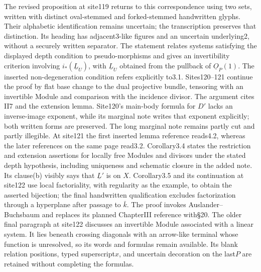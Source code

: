 The revised proposition at site119 returns to this correspondence using two sets, written with distinct oval-stemmed and forked-stemmed handwritten glyphs. Their alphabetic identification remains uncertain; the transcription preserves that distinction. Its heading has adjacent3-like figures and an uncertain underlying2, without a securely written separator. The statement relates systems satisfying the displayed depth condition to pseudo-morphisms and gives an invertibility criterion involving $i_*(\underline L_U)$, with $\underline L_U$ obtained from the pullback of $\underline O_P(1)$. The inserted non-degeneration condition refers explicitly to3.1. Sites120--121 continue the proof by flat base change to the dual projective bundle, tensoring with an invertible Module and comparison with the incidence divisor. The argument cites II7 and the extension lemma. Site120's main-body formula for $D'$ lacks an inverse-image exponent, while its marginal note writes that exponent explicitly; both written forms are preserved. The long marginal note remains partly cut and partly illegible. At site121 the first inserted lemma reference reads4.2, whereas the later references on the same page read3.2. Corollary3.4 states the restriction and extension assertions for locally free Modules and divisors under the stated depth hypothesis, including uniqueness and schematic closure in the added note. Its clause(b) visibly says that $\underline L'$ is on $X$. Corollary3.5 and its continuation at site122 use local factoriality, with regularity as the example, to obtain the asserted bijection; the final handwritten qualification excludes factorization through a hyperplane after passage to $\bar k$. The proof invokes Auslander--Buchsbaum and replaces its planned ChapterIII reference with\S20. The older final paragraph at site122 discusses an invertible Module associated with a linear system. It lies beneath crossing diagonals with an arrow-like terminal whose function is unresolved, so its words and formulas remain available. Its blank relation positions, typed superscript$x$, and uncertain decoration on the last$P$ are retained without completing the formulas.
